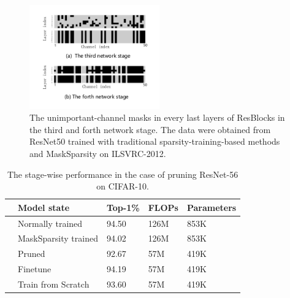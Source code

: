 \documentclass[review]{cvpr}
\begin{document}
 
\begin{figure}[h!]
	\begin{centering}
		\includegraphics[width=0.5\textwidth]{figure/stage_mask_ablationstudy.pdf} 
	    \caption{ The unimportant-channel masks in every last layers of ResBlocks in the third and forth network stage.	The data were obtained from ResNet50 trained with traditional sparsity-training-based methods and MaskSparsity on ILSVRC-2012.
    	}
        \label{Pruning-mask-exp}
    \par\end{centering}
\end{figure}


 
  

\begin{table}[ht]

	\caption{The stage-wise performance in the case of  pruning ResNet-56 on CIFAR-10.}
	\small
	\setlength{\tabcolsep}{0.5em}
	\begin{center}
		\begin{tabular}{lllll}
			\toprule
		&Model state               &Top-1\%           &FLOPs          &Parameters \\
		\midrule
		&Normally trained      &94.50            &126M      &853K  \\
		&MaskSparsity trained        &94.02             &126M      &853K  \\
		
		&Pruned      &92.67             &57M     &419K  \\
		&Finetune       &94.19             &57M    &419K \\
		\hline
		&Train from Scratch   &93.60            &57M  &419K  \\
		\bottomrule
			
		\end{tabular}
	\end{center} 
	\label{Finetune_scratch_cifar10}
\end{table}
\end{document}
